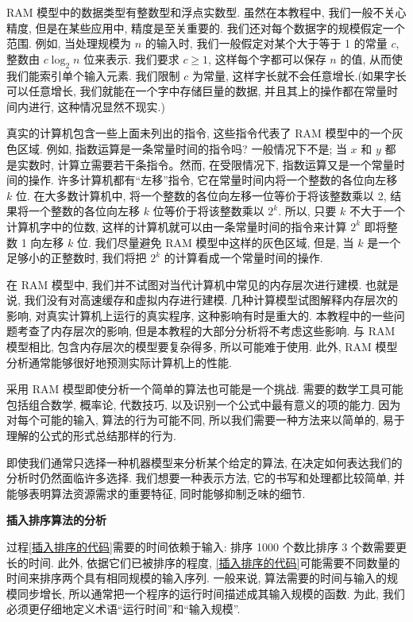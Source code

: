 \documentclass[oneside,10pt,fontset=none]{ctexbook}
\numberwithin{definition}{chapter}
\numberwithin{theorem}{chapter}
\numberwithin{lemma}{chapter}
\begin{document}
RAM 模型中的数据类型有整数型和浮点实数型. 虽然在本教程中, 我们一般不关心精度, 但是在某些应用中, 精度是至关重要的. 我们还对每个数据字的规模假定一个范围. 例如, 当处理规模为 $n$ 的输入时, 我们一般假定对某个大于等于 1 的常量 $c$, 整数由 $c\log_2n$ 位来表示. 我们要求 $c\geq 1$, 这样每个字都可以保存 $n$ 的值, 从而使我们能索引单个输入元素. 我们限制 $c$ 为常量, 这样字长就不会任意增长.(如果字长可以任意增长, 我们就能在一个字中存储巨量的数据, 并且其上的操作都在常量时间内进行, 这种情况显然不现实.)

真实的计算机包含一些上面未列出的指令, 这些指令代表了 RAM 模型中的一个灰色区域. 例如, 指数运算是一条常量时间的指令吗? 一般情况下不是; 当 $x$ 和 $y$ 都是实数时, 计算立需要若干条指令。然而, 在受限情况下, 指数运算又是一个常量时间的操作. 许多计算机都有``左移''指令, 它在常量时间内将一个整数的各位向左移 $k$ 位. 在大多数计算机中, 将一个整数的各位向左移一位等价于将该整数乘以 2, 结果将一个整数的各位向左移 $k$ 位等价于将该整数乘以 $2^k$. 所以, 只要 $k$ 不大于一个计算机字中的位数, 这样的计算机就可以由一条常量时间的指令来计算 $2^k$ 即将整数 1 向左移 $k$ 位. 我们尽量避免 RAM 模型中这样的灰色区域, 但是, 当 $k$ 是一个足够小的正整数时, 我们将把 $2^k$ 的计算看成一个常量时间的操作.

在 RAM 模型中, 我们并不试图对当代计算机中常见的内存层次进行建模. 也就是说, 我们没有对高速缓存和虚拟内存进行建模. 几种计算模型试图解释内存层次的影响, 对真实计算机上运行的真实程序, 这种影响有时是重大的. 本教程中的一些问题考查了内存层次的影响, 但是本教程的大部分分析将不考虑这些影响. 与 RAM 模型相比, 包含内存层次的模型要复杂得多, 所以可能难于使用. 此外, RAM 模型分析通常能够很好地预测实际计算机上的性能.

采用 RAM 模型即使分析一个简单的算法也可能是一个挑战. 需要的数学工具可能包括组合数学, 概率论, 代数技巧, 以及识别一个公式中最有意义的项的能力. 因为对每个可能的输入, 算法的行为可能不同, 所以我们需要一种方法来以简单的, 易于理解的公式的形式总结那样的行为.

即使我们通常只选择一种机器模型来分析某个给定的算法, 在决定如何表达我们的分析时仍然面临许多选择. 我们想要一种表示方法, 它的书写和处理都比较简单, 并能够表明算法资源需求的重要特征, 同时能够抑制乏味的细节.

\textbf{插入排序算法的分析}

过程\ref{插入排序的代码}需要的时间依赖于输入: 排序 1000 个数比排序 3 个数需要更长的时间. 此外, 依据它们已被排序的程度, \ref{插入排序的代码}可能需要不同数量的时间来排序两个具有相同规模的输入序列. 一般来说, 算法需要的时间与输入的规模同步增长, 所以通常把一个程序的运行时间描述成其输入规模的函数. 为此, 我们必须更仔细地定义术语``运行时间''和``输入规模''.
\end{document}
